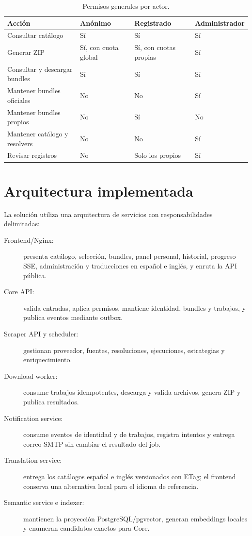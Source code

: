 \begin{table}[H]
	\centering
	\small
	\begin{tabularx}{\textwidth}{p{}XXX}
		\toprule
		\textbf{Acción}               & \textbf{Anónimo} & \textbf{Registrado}     & \textbf{Administrador} \\
		\midrule
		Consultar catálogo            & Sí               & Sí                      & Sí                     \\
		Generar ZIP                   & Sí, con cuota global   & Sí, con cuotas propias  & Sí                     \\
		Consultar y descargar bundles & Sí               & Sí                      & Sí                     \\
		Mantener bundles oficiales    & No               & No                      & Sí                     \\
		Mantener bundles propios      & No               & Sí 					   & No                     \\
		Mantener catálogo y resolvers & No               & No                      & Sí                     \\
		Revisar registros             & No               & Solo los propios        & Sí                     \\
		\bottomrule
	\end{tabularx}
	\caption{Permisos generales por actor.}
	\label{tabla:permisos-actores}
\end{table}

\section{Arquitectura implementada}

La solución utiliza una arquitectura de servicios con responsabilidades delimitadas:

\begin{description}
	\item[Frontend/Nginx:] presenta catálogo, selección, bundles, panel personal, historial, progreso SSE, administración y traducciones en español e inglés, y enruta la API pública.
	\item[Core API:] valida entradas, aplica permisos, mantiene identidad, bundles y trabajos, y publica eventos mediante outbox.
	\item[Scraper API y scheduler:] gestionan proveedor, fuentes, resoluciones, ejecuciones, estrategias y enriquecimiento.
	\item[Download worker:] consume trabajos idempotentes, descarga y valida archivos, genera ZIP y publica resultados.
	\item[Notification service:] consume eventos de identidad y de trabajos, registra intentos y entrega correo SMTP sin cambiar el resultado del job.
	\item[Translation service:] entrega los catálogos español e inglés versionados con ETag; el frontend conserva una alternativa local para el idioma de referencia.
	\item[Semantic service e indexer:] mantienen la proyección PostgreSQL/pgvector, generan embeddings locales y enumeran candidatos exactos para Core.
\end{description}

